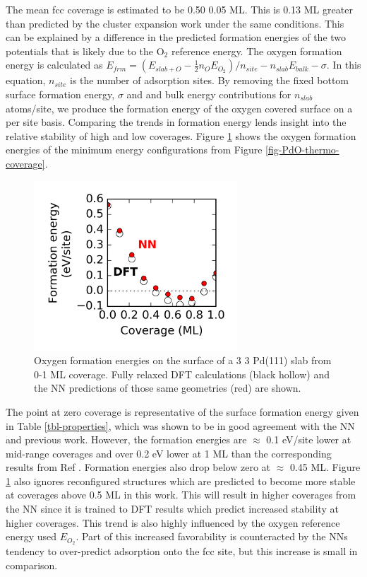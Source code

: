 \documentclass[12pt,oneside]{cmuthesis}
\begin{document}
The mean fcc coverage is estimated to be 0.50 \textpm{} 0.05 ML. This is 0.13 ML greater than predicted by the cluster expansion work under the same conditions. This can be explained by a difference in the predicted formation energies of the two potentials that is likely due to the O\(_{\text{2}}\) reference energy. The oxygen formation energy is calculated as \(E_{frm} = (E_{slab+O} - \frac{1}{2} n_{O} E_{O_{2}})/n_{site} - n_{slab} E_{bulk} - \sigma\). In this equation, \(n_{site}\) is the number of adsorption sites. By removing the fixed bottom surface formation energy, \(\sigma\) and and bulk energy contributions for \(n_{slab}\) atoms/site, we produce the formation energy of the oxygen covered surface on a per site basis. Comparing the trends in formation energy lends insight into the relative stability of high and low coverages. Figure \ref{fig-formation-energy} shows the oxygen formation energies of the minimum energy configurations from Figure \ref{fig-PdO-thermo-coverage}.

\begin{figure}[htbp]
\centering
\includegraphics[width=3in]{./images/formation-energy.png}
\caption{\label{fig-formation-energy}
Oxygen formation energies on the surface of a 3 \texttimes{} 3 Pd(111) slab from 0-1 ML coverage. Fully relaxed DFT calculations (black hollow) and the NN predictions of those same geometries (red) are shown.}
\end{figure}

The point at zero coverage is representative of the surface formation energy given in Table \ref{tbl-properties}, which was shown to be in good agreement with the NN and previous work. However, the formation energies are \(\approx\) 0.1 eV/site lower at mid-range coverages and over 0.2 eV lower at 1 ML than the corresponding results from Ref . Formation energies also drop below zero at \(\approx\) 0.45 ML. Figure \ref{fig-formation-energy} also ignores reconfigured structures which are predicted to become more stable at coverages above 0.5 ML in this work. This will result in higher coverages from the NN since it is trained to DFT results which predict increased stability at higher coverages. This trend is also highly influenced by the oxygen reference energy used \(E_{O_{2}}\). Part of this increased favorability is counteracted by the NNs tendency to over-predict adsorption onto the fcc site, but this increase is small in comparison.
\end{document}
